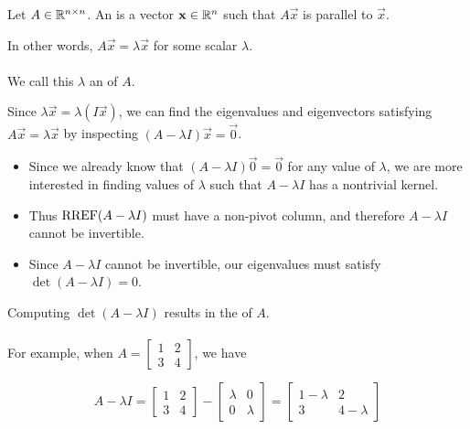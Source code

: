 \begin{applicationActivities}
\begin{definition}Let $A \in \mathbb{R}^{n \times n}$.
An  is a vector $\mathbf{x} \in \mathbb{R}^n$ such that $A\vec{x}$ is parallel to $\vec{x}$.

In other words, $A\vec{x}=\lambda \vec{x}$ for some scalar $\lambda$. \\

\ \\

We call this \(\lambda\) an  of \(A\).
\end{definition}

\begin{observation}
Since \(\lambda\vec x=\lambda (I\vec x)\), we can find the eigenvalues and
eigenvectors satisfying $A\vec{x}=\lambda \vec{x}$ by inspecting
$(A-\lambda I)\vec{x} = \vec0$.
\begin{itemize}
\item Since we already know that $(A-\lambda I)\vec0 = \vec0$
for any value of \(\lambda\),
we are more interested in finding values of $\lambda$ such that
$A-\lambda I$ has a nontrivial kernel.
\item Thus \(\operatorname{RREF}(A-\lambda I)\) must have a non-pivot column, and therefore
\(A-\lambda I\) cannot be invertible.
\item
Since \(A-\lambda I\) cannot be invertible, our eigenvalues must satisfy
\(\det(A-\lambda I)=0\).
\end{itemize}
\end{observation}

\begin{definition}
Computing \(\det(A-\lambda I)\) results in the
 of \(A\). \\

\ \\

For example, when
\(A=\begin{bmatrix}1 & 2 \\ 3 & 4\end{bmatrix}\), we have

\[
  A-\lambda I=
  \begin{bmatrix}1 & 2 \\ 3 & 4\end{bmatrix}-
  \begin{bmatrix}\lambda & 0 \\ 0 & \lambda\end{bmatrix}=
  \begin{bmatrix}1-\lambda & 2 \\ 3 & 4-\lambda\end{bmatrix}
\]


\end{definition}
\end{applicationActivities}
